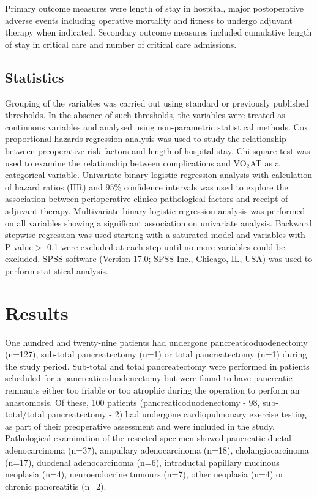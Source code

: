 Primary outcome measures were length of stay in hospital, major postoperative adverse events including operative mortality and fitness to undergo adjuvant therapy when indicated. Secondary outcome measures included cumulative length of stay in critical care and number of critical care admissions.

\subsection{Statistics}
Grouping of the variables was carried out using standard or previously published thresholds. In the absence of such thresholds, the variables were treated as continuous variables and analysed using non-parametric statistical methods. Cox proportional hazards regression analysis was used to study the relationship between preoperative risk factors and length of hospital stay. Chi-square test was used to examine the relationship between complications and VO$_2$AT as a categorical variable. Univariate binary logistic regression analysis with calculation of hazard ratios (HR) and 95\% confidence intervals was used to explore the association between perioperative clinico-pathological factors and receipt of adjuvant therapy. Multivariate binary logistic regression analysis was performed on all variables showing a significant association on univariate analysis. Backward stepwise regression was used starting with a saturated model and variables with P-value$>$  0.1 were excluded at each step until no more variables could be excluded. SPSS software (Version 17.0; SPSS Inc., Chicago, IL, USA) was used to perform statistical analysis.

\clearpage

\section{Results}
One hundred and twenty-nine patients had undergone pancreaticoduodenectomy (n=127), sub-total pancreatectomy (n=1) or total pancreatectomy (n=1) during the study period. Sub-total and total pancreatectomy were performed in patients scheduled for a pancreaticoduodenectomy but were found to have pancreatic remnants either too friable or too atrophic during the operation to perform an anastomosis. Of these, 100 patients (pancreaticoduodenectomy - 98, sub-total/total pancreatectomy - 2) had undergone cardiopulmonary exercise testing as part of their preoperative assessment and were included in the study. Pathological examination of the resected specimen showed pancreatic ductal adenocarcinoma (n=37), ampullary adenocarcinoma (n=18), cholangiocarcinoma (n=17), duodenal adenocarcinoma (n=6), intraductal papillary mucinous neoplasia (n=4), neuroendocrine tumours (n=7), other neoplasia (n=4) or chronic pancreatitis (n=2).

